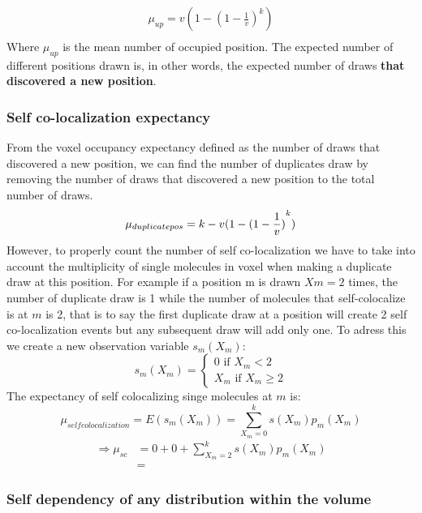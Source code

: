 \documentclass{article}
\begin{document}
\begin{equation}
    \begin{split}
    \mu_{up} = v(1-{(1-\frac{1}{v})}^k) \\
    \end{split}
\end{equation}
Where $\mu_{up}$ is the mean number of occupied position.
The expected number of different positions drawn is, in other words, the expected number of draws \textbf{that discovered a new position}.

\subsubsection{Self co-localization expectancy}

From the voxel occupancy expectancy defined as the number of draws that discovered a new position, we can find the number of duplicates draw by removing the 
number of draws that discovered a new position to the total number of draws.
\[
    \mu_{duplicate pos} = k-  v(1-{(1-\frac{1}{v})}^k) \\
\]
However, to properly count the number of self co-localization we have to take into account the multiplicity of single molecules in voxel when making a duplicate
draw at this position. For example if a position m is drawn $Xm = 2$ times, the number of duplicate draw is 1 while the number of molecules that self-colocalize is
at $m$ is 2, that is to say the first duplicate draw at a position will create 2 self co-localization events but any subsequent draw will add only one. To adress 
this we create a new observation variable $s_m(X_m)$:
\[
    s_m(X_m) = \begin{cases}
    0 \text{ if } X_m < 2 \\
    X_m \text{ if } X_m \geq 2
\end{cases}
\]
The expectancy of self colocalizing singe molecules at $m$ is:
\[
    \mu_{selfcolocalization} = E(s_m(X_m)) = \sum_{X_m=0}^{k}s(X_m)p_m(X_m)
\]
\[\begin{split}
    \Rightarrow \mu_{sc} &= 0 + 0 + \sum_{X_m=2}^{k}s(X_m)p_m(X_m) \\
    &= 
\end{split}
\]

\subsubsection{Self dependency of any distribution within the volume}
\end{document}
